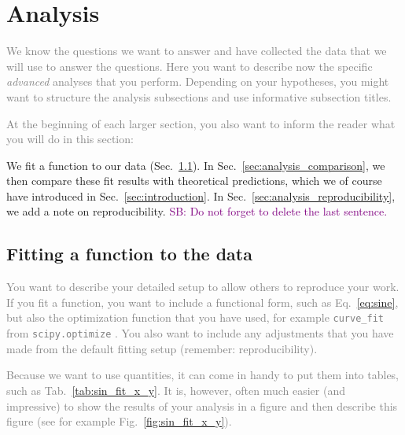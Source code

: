 \documentclass[
  journal=pasa,
  manuscript=Research-Article,
  year=2025,
  volume=X,
]{cup-journal}
\newcommand{\SB}[1]{{\textcolor{purple}{SB: #1}}}
\newcommand{\comment}[1]{\textcolor{gray}{#1}}
\begin{document}
\section{Analysis} \label{sec:analysis}

\comment{We know the questions we want to answer and have collected the data that we will use to answer the questions. Here you want to describe now the specific \textit{advanced} analyses that you perform. Depending on your hypotheses, you might want to structure the analysis subsections and use informative subsection titles.}

\comment{At the beginning of each larger section, you also want to inform the reader what you will do in this section:}

We fit a function to our data (Sec.~\ref{sec:analysis_fitting}). In Sec.~\ref{sec:analysis_comparison}, we then compare these fit results with theoretical predictions, which we of course have introduced in Sec.~\ref{sec:introduction}. In Sec.~\ref{sec:analysis_reproducibility}, we add a note on reproducibility. \SB{Do not forget to delete the last sentence.}

\subsection{Fitting a function to the data} \label{sec:analysis_fitting}

\comment{You want to describe your detailed setup to allow others to reproduce your work. If you fit a function, you want to include a functional form, such as Eq.~\ref{eq:sine}, but also the optimization function that you have used, for example \texttt{curve\_fit} from \texttt{scipy.optimize} \citep{Scipy}. You also want to include any adjustments that you have made from the default fitting setup (remember: reproducibility).}

\comment{Because we want to use quantities, it can come in handy to put them into tables, such as Tab.~\ref{tab:sin_fit_x_y}. It is, however, often much easier (and impressive) to show the results of your analysis in a figure and then describe this figure (see for example Fig.~\ref{fig:sin_fit_x_y}).}


\end{document}
